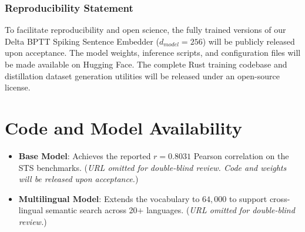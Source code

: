 \documentclass[10pt,a4paper,twoside]{article}
\begin{document}
\subsubsection*{Reproducibility Statement}
To facilitate reproducibility and open science, the fully trained versions of our Delta BPTT Spiking Sentence Embedder ($d_{model} = 256$) will be publicly released upon acceptance. The model weights, inference scripts, and configuration files will be made available on Hugging Face. The complete Rust training codebase and distillation dataset generation utilities will be released under an open-source license.




\appendix
\section{Code and Model Availability}
\begin{itemize}
    \item \textbf{Base Model}: Achieves the reported $r = 0.8031$ Pearson correlation on the STS benchmarks. (\textit{URL omitted for double-blind review. Code and weights will be released upon acceptance.})
    \item \textbf{Multilingual Model}: Extends the vocabulary to $64{,}000$ to support cross-lingual semantic search across 20+ languages. (\textit{URL omitted for double-blind review.})
\end{itemize}
\end{document}
